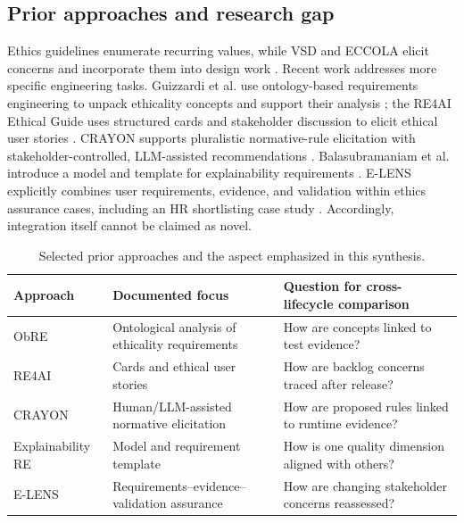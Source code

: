 \documentclass[11pt,a4paper]{article}
\begin{document}
\subsection{Prior approaches and research gap}
Ethics guidelines enumerate recurring values, while VSD and ECCOLA elicit concerns and incorporate them into design work \cite{jobin2019,friedman2013,vakkuri2021}. Recent work addresses more specific engineering tasks. Guizzardi et al. use ontology-based requirements engineering to unpack ethicality concepts and support their analysis \cite{guizzardi2023}; the RE4AI Ethical Guide uses structured cards and stakeholder discussion to elicit ethical user stories \cite{siqueira2022}. CRAYON supports pluralistic normative-rule elicitation with stakeholder-controlled, LLM-assisted recommendations \cite{abodinar2026}. Balasubramaniam et al. introduce a model and template for explainability requirements \cite{balasubramaniam2023}. E-LENS explicitly combines user requirements, evidence, and validation within ethics assurance cases, including an HR shortlisting case study \cite{zhou2025}. Accordingly, integration itself cannot be claimed as novel.

\begin{table}[htbp]
\centering\footnotesize
\caption{Selected prior approaches and the aspect emphasized in this synthesis.}
\label{tab:prior}
\begin{tabularx}{\linewidth}{p{2.25cm}p{3.15cm}X}
\toprule
\textbf{Approach} & \textbf{Documented focus} & \textbf{Question for cross-lifecycle comparison}\\
\midrule
ObRE \cite{guizzardi2023} & Ontological analysis of ethicality requirements & How are concepts linked to test evidence?\\
RE4AI \cite{siqueira2022} & Cards and ethical user stories & How are backlog concerns traced after release?\\
CRAYON \cite{abodinar2026} & Human/LLM-assisted normative elicitation & How are proposed rules linked to runtime evidence?\\
Explainability RE \cite{balasubramaniam2023} & Model and requirement template & How is one quality dimension aligned with others?\\
E-LENS \cite{zhou2025} & Requirements--evidence--validation assurance & How are changing stakeholder concerns reassessed?\\
\bottomrule
\end{tabularx}
\end{table}
\end{document}
